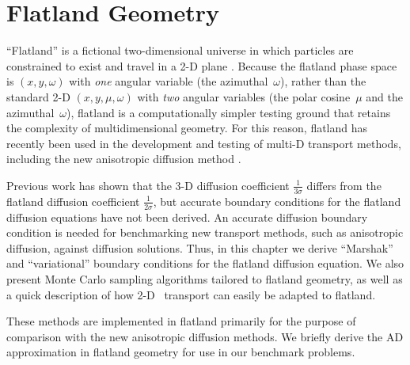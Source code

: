 
\chapter{Flatland Geometry}\label{chap:flatland}

``Flatland'' is a fictional two-dimensional universe in which particles are
constrained to exist and
travel in a 2-D plane \cite{Asa2008}. Because the flatland phase space is
$(x,y,\omega)$ with \emph{one} angular variable (the azimuthal~$\omega$),
rather than the
standard 2-D $(x,y,\mu,\omega)$ with \emph{two} angular variables (the
polar cosine~$\mu$ and the azimuthal~$\omega$),
flatland is a computationally simpler testing ground that retains the
complexity of multidimensional geometry. For this reason, flatland has recently
been used in the development and testing of multi-D transport methods, including
the new anisotropic diffusion method \cite{Lar2009c,Bor2010,Joh2011,Tra2011}.

Previous work has shown that the 3-D diffusion coefficient
$\frac{1}{3\sigma}$ differs from the flatland diffusion coefficient
$\frac{1}{2\sigma}$, but accurate boundary conditions for the flatland
diffusion equations have not been derived. An accurate diffusion
boundary condition is needed for benchmarking new transport methods, such as
anisotropic diffusion, against
diffusion solutions. Thus, in this chapter we derive ``Marshak''
and ``variational'' boundary conditions for the flatland diffusion equation.
We also present Monte Carlo sampling algorithms tailored to flatland
geometry, as well as a quick description of how 2-D \SN\ transport can easily be
adapted to flatland.

These methods are implemented in flatland primarily for the purpose of
comparison with the new anisotropic diffusion methods. We briefly derive the
AD approximation in flatland geometry for use in our benchmark problems.

%

